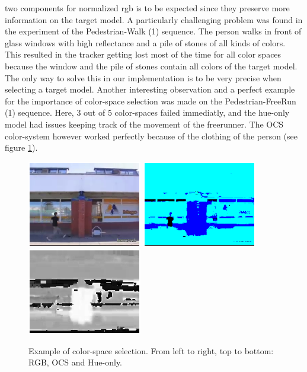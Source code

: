 \documentclass[a4paper,11pt]{article}
\begin{document}
		two components for normalized rgb is to be expected since they preserve more information on the
		target model. A particularly challenging problem was found in the experiment of the Pedestrian-Walk
		(1) sequence. The person walks in front of glass windows with high reflectance and a pile of stones
		of all kinds of colors. This resulted in the tracker getting lost most of the time for all color
		spaces because the window and the pile of stones contain all colors of the target model. The only
		way to solve this in our implementation is to be very precise when selecting a target model. Another
		interesting observation and a perfect example for the importance of color-space selection was made
		on the Pedestrian-FreeRun (1) sequence. Here, $3$ out of $5$ color-spaces failed immediatly, and the
		hue-only model had issues keeping track of the movement of the freerunner. The OCS color-system
		however worked perfectly because of the clothing of the person (see figure \ref{fig:FREE}). 
		\begin{figure}[H]
			\begin{center}
				\includegraphics[width=5cm]{img/example_free1.eps}
				\includegraphics[width=5cm]{img/example_free2.eps}
				\includegraphics[width=5cm]{img/example_free3.eps}\\
			\end{center}
			\caption{
				Example of color-space selection. From left to
				right, top to bottom: RGB, OCS and Hue-only.
			}
			\label{fig:FREE}
		\end{figure}
		
\end{document}
